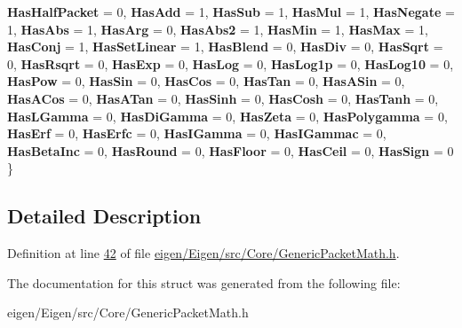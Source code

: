 \begin{DoxyCompactItemize}
{\bfseries Has\+Half\+Packet} = 0, 
{\bfseries Has\+Add} = 1, 
{\bfseries Has\+Sub} = 1, 
{\bfseries Has\+Mul} = 1, 
\newline
{\bfseries Has\+Negate} = 1, 
{\bfseries Has\+Abs} = 1, 
{\bfseries Has\+Arg} = 0, 
{\bfseries Has\+Abs2} = 1, 
\newline
{\bfseries Has\+Min} = 1, 
{\bfseries Has\+Max} = 1, 
{\bfseries Has\+Conj} = 1, 
{\bfseries Has\+Set\+Linear} = 1, 
\newline
{\bfseries Has\+Blend} = 0, 
{\bfseries Has\+Div} = 0, 
{\bfseries Has\+Sqrt} = 0, 
{\bfseries Has\+Rsqrt} = 0, 
\newline
{\bfseries Has\+Exp} = 0, 
{\bfseries Has\+Log} = 0, 
{\bfseries Has\+Log1p} = 0, 
{\bfseries Has\+Log10} = 0, 
\newline
{\bfseries Has\+Pow} = 0, 
{\bfseries Has\+Sin} = 0, 
{\bfseries Has\+Cos} = 0, 
{\bfseries Has\+Tan} = 0, 
\newline
{\bfseries Has\+A\+Sin} = 0, 
{\bfseries Has\+A\+Cos} = 0, 
{\bfseries Has\+A\+Tan} = 0, 
{\bfseries Has\+Sinh} = 0, 
\newline
{\bfseries Has\+Cosh} = 0, 
{\bfseries Has\+Tanh} = 0, 
{\bfseries Has\+L\+Gamma} = 0, 
{\bfseries Has\+Di\+Gamma} = 0, 
\newline
{\bfseries Has\+Zeta} = 0, 
{\bfseries Has\+Polygamma} = 0, 
{\bfseries Has\+Erf} = 0, 
{\bfseries Has\+Erfc} = 0, 
\newline
{\bfseries Has\+I\+Gamma} = 0, 
{\bfseries Has\+I\+Gammac} = 0, 
{\bfseries Has\+Beta\+Inc} = 0, 
{\bfseries Has\+Round} = 0, 
\newline
{\bfseries Has\+Floor} = 0, 
{\bfseries Has\+Ceil} = 0, 
{\bfseries Has\+Sign} = 0
 \}
\end{DoxyCompactItemize}


\subsection{Detailed Description}


Definition at line \hyperlink{eigen_2_eigen_2src_2_core_2_generic_packet_math_8h_source_l00042}{42} of file \hyperlink{eigen_2_eigen_2src_2_core_2_generic_packet_math_8h_source}{eigen/\+Eigen/src/\+Core/\+Generic\+Packet\+Math.\+h}.



The documentation for this struct was generated from the following file\+:\begin{DoxyCompactItemize}
\item 
eigen/\+Eigen/src/\+Core/\+Generic\+Packet\+Math.\+h\end{DoxyCompactItemize}
